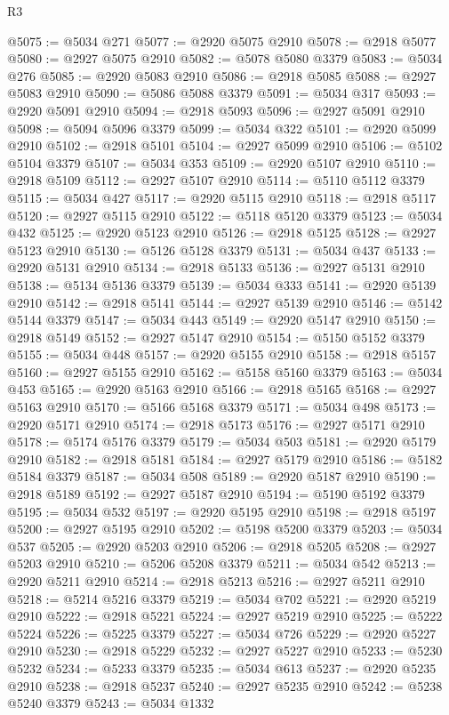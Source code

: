 \begin{lexlean}{R3}
\begin{coremodule}
@5075 := @5034 @271
@5077 := @2920 @5075 @2910
@5078 := @2918 @5077
@5080 := @2927 @5075 @2910
@5082 := @5078 @5080 @3379
@5083 := @5034 @276
@5085 := @2920 @5083 @2910
@5086 := @2918 @5085
@5088 := @2927 @5083 @2910
@5090 := @5086 @5088 @3379
@5091 := @5034 @317
@5093 := @2920 @5091 @2910
@5094 := @2918 @5093
@5096 := @2927 @5091 @2910
@5098 := @5094 @5096 @3379
@5099 := @5034 @322
@5101 := @2920 @5099 @2910
@5102 := @2918 @5101
@5104 := @2927 @5099 @2910
@5106 := @5102 @5104 @3379
@5107 := @5034 @353
@5109 := @2920 @5107 @2910
@5110 := @2918 @5109
@5112 := @2927 @5107 @2910
@5114 := @5110 @5112 @3379
@5115 := @5034 @427
@5117 := @2920 @5115 @2910
@5118 := @2918 @5117
@5120 := @2927 @5115 @2910
@5122 := @5118 @5120 @3379
@5123 := @5034 @432
@5125 := @2920 @5123 @2910
@5126 := @2918 @5125
@5128 := @2927 @5123 @2910
@5130 := @5126 @5128 @3379
@5131 := @5034 @437
@5133 := @2920 @5131 @2910
@5134 := @2918 @5133
@5136 := @2927 @5131 @2910
@5138 := @5134 @5136 @3379
@5139 := @5034 @333
@5141 := @2920 @5139 @2910
@5142 := @2918 @5141
@5144 := @2927 @5139 @2910
@5146 := @5142 @5144 @3379
@5147 := @5034 @443
@5149 := @2920 @5147 @2910
@5150 := @2918 @5149
@5152 := @2927 @5147 @2910
@5154 := @5150 @5152 @3379
@5155 := @5034 @448
@5157 := @2920 @5155 @2910
@5158 := @2918 @5157
@5160 := @2927 @5155 @2910
@5162 := @5158 @5160 @3379
@5163 := @5034 @453
@5165 := @2920 @5163 @2910
@5166 := @2918 @5165
@5168 := @2927 @5163 @2910
@5170 := @5166 @5168 @3379
@5171 := @5034 @498
@5173 := @2920 @5171 @2910
@5174 := @2918 @5173
@5176 := @2927 @5171 @2910
@5178 := @5174 @5176 @3379
@5179 := @5034 @503
@5181 := @2920 @5179 @2910
@5182 := @2918 @5181
@5184 := @2927 @5179 @2910
@5186 := @5182 @5184 @3379
@5187 := @5034 @508
@5189 := @2920 @5187 @2910
@5190 := @2918 @5189
@5192 := @2927 @5187 @2910
@5194 := @5190 @5192 @3379
@5195 := @5034 @532
@5197 := @2920 @5195 @2910
@5198 := @2918 @5197
@5200 := @2927 @5195 @2910
@5202 := @5198 @5200 @3379
@5203 := @5034 @537
@5205 := @2920 @5203 @2910
@5206 := @2918 @5205
@5208 := @2927 @5203 @2910
@5210 := @5206 @5208 @3379
@5211 := @5034 @542
@5213 := @2920 @5211 @2910
@5214 := @2918 @5213
@5216 := @2927 @5211 @2910
@5218 := @5214 @5216 @3379
@5219 := @5034 @702
@5221 := @2920 @5219 @2910
@5222 := @2918 @5221
@5224 := @2927 @5219 @2910
@5225 := @5222 @5224
@5226 := @5225 @3379
@5227 := @5034 @726
@5229 := @2920 @5227 @2910
@5230 := @2918 @5229
@5232 := @2927 @5227 @2910
@5233 := @5230 @5232
@5234 := @5233 @3379
@5235 := @5034 @613
@5237 := @2920 @5235 @2910
@5238 := @2918 @5237
@5240 := @2927 @5235 @2910
@5242 := @5238 @5240 @3379
@5243 := @5034 @1332

\end{coremodule}
\end{lexlean}
